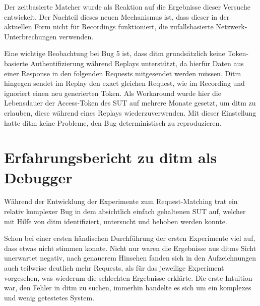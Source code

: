 \documentclass[12pt,a4paper]{report}
\begin{document}
Der zeitbasierte Matcher wurde als Reaktion auf die Ergebnisse dieser Versuche entwickelt. Der Nachteil dieses neuen
Mechanismus ist, dass dieser in der aktuellen Form nicht für Recordings funktioniert, die zufallsbasierte Netzwerk-Unterbrechungen
verwenden.

Eine wichtige Beobachtung bei Bug 5 ist, dass ditm grundsätzlich keine Token-basierte Authentifizierung während Replays unterstützt, da hierfür
Daten aus einer Response in den folgenden Requests mitgesendet werden müssen. Ditm hingegen sendet im Replay den exact gleichen
Request, wie im Recording und ignoriert einen neu generierten Token. Als Workaround wurde hier die Lebensdauer der Access-Token
des SUT auf mehrere Monate gesetzt, um ditm zu erlauben, diese während eines Replays wiederzuverwenden. Mit dieser Einstellung
hatte ditm keine Probleme, den Bug deterministisch zu reproduzieren.

\section{Erfahrungsbericht zu ditm als Debugger}
\label{chap:debugging_go}
Während der Entwicklung der Experimente zum Request-Matching trat ein relativ komplexer Bug in dem absichtlich einfach
gehaltenen SUT auf, welcher mit Hilfe von ditm identifiziert, untersucht und behoben werden konnte.

Schon bei einer ersten händischen Durchführung der ersten Experimente viel auf, dass etwas nicht stimmen konnte.
Nicht nur waren die Ergebnisse aus ditms Sicht unerwartet negativ, nach genauerem Hinsehen fanden sich in den Aufzeichnungen auch
teilweise deutlich mehr Requests, als für das jeweilige Experiment vorgesehen, was wiederum die schlechten Ergebnisse erklärte.
Die erste Intuition war, den Fehler in ditm zu suchen, immerhin handelte es sich um ein komplexes und wenig getestetes System.
\end{document}
